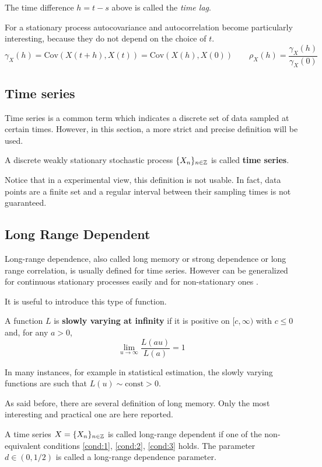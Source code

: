 The time difference $h = t - s$ above is called the \emph{time lag}.

For a stationary process autocovariance and autocorrelation become particularly interesting, because they do not depend on the choice of $t$.
\begin{equation}
	\gamma_X(h) = \text{Cov}(X(t+h), X(t)) = \text{Cov}(X(h), X(0)) \qquad \rho_X(h) = \frac{\gamma_X(h)}{\gamma_X(0)}
\end{equation}
\subsection{Time series}
Time series is a common term which indicates a discrete set of data sampled at certain times. However, in this section, a more strict and precise definition will be used.
\begin{definition}
	A discrete weakly stationary stochastic process $\{X_n\}_{n \in \mathbb{Z}}$ is called \textbf{time series}.
\end{definition}

Notice that in a experimental view, this definition is not usable. In fact, data points are a finite set and a regular interval between their sampling times is not guaranteed.

\subsection{Long Range Dependent}
Long-range dependence, also called long memory or strong dependence or long range correlation, is usually defined for time series. However can be generalized for continuous stationary processes easily \cite{pipiras_taqqu_2017} and for non-stationary ones \cite{Movahed_2006}.

It is useful to introduce this type of function.
\begin{definition}
	A function $L$ is \textbf{slowly varying at infinity} if it is positive on $[c, \infty)$ with $c \le 0$ and, for any $a > 0$,
	\begin{equation}
		\lim_{u \to \infty} \frac{L(au)}{L(a)} = 1
	\end{equation}
\end{definition}

In many instances, for example in statistical estimation, the slowly varying
functions are such that $L(u) \sim \text{const} > 0$. 

As said before, there are several definition of long memory. Only the most interesting and practical one are here reported.
\begin{definition}
	A time series $X = \{ X_n \}_{n \in \mathbb{Z}}$ is called long-range dependent if one of the non-equivalent conditions \autoref{cond:1}, \autoref{cond:2}, \autoref{cond:3} holds. The parameter $d \in (0, 1/2)$ is called a long-range dependence parameter.
\end{definition}


